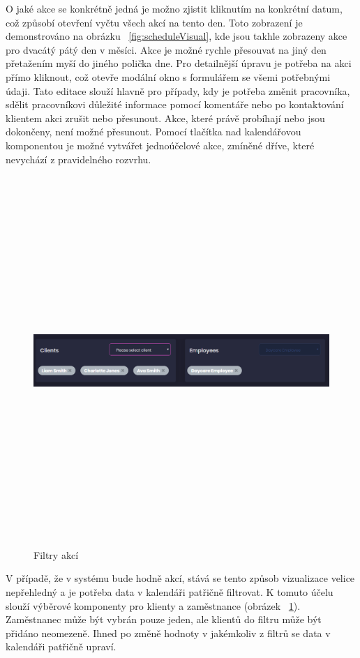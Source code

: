 \documentclass[
  biblatex,
  glossaries,
  index
]{kidiplom}
\begin{document}
O jaké akce se konkrétně jedná je možno zjistit kliknutím na konkrétní datum, což způsobí otevření vyčtu všech akcí na tento den. Toto zobrazení je demonstrováno na obrázku ~\ref{fig:scheduleVisual}, kde jsou takhle zobrazeny akce pro dvacátý pátý den v měsíci. Akce je možné rychle přesouvat na jiný den přetažením myší do jiného polička dne. Pro detailnější úpravu je potřeba na akci přímo kliknout, což otevře modální okno s formulářem se všemi potřebnými údaji. Tato editace slouží hlavně pro případy, kdy je potřeba změnit pracovníka, sdělit pracovníkovi důležité informace pomocí komentáře nebo po kontaktování klientem akci zrušit nebo přesunout. Akce, které právě probíhají nebo jsou dokončeny, není možné přesunout. Pomocí tlačítka nad kalendářovou komponentou je možné vytvářet jednoúčelové akce, zmíněné dříve, které nevychází z pravidelného rozvrhu.

\begin{figure}[H]
  	\centering
 	 \includegraphics[width=14cm,height=14cm,keepaspectratio]{schedule_filters}
 	 \caption{Filtry akcí}
 	 \label{fig:scheduleFilter}
\end{figure}

V případě, že v systému bude hodně akcí, stává se tento způsob vizualizace velice nepřehledný a je potřeba data v kalendáři patřičně filtrovat. K tomuto účelu slouží výběrové komponenty pro klienty a zaměstnance (obrázek ~\ref{fig:scheduleFilter}). Zaměstnanec může být vybrán pouze jeden, ale klientů do filtru může být přidáno neomezeně. Ihned po změně hodnoty v jakémkoliv z filtrů se data v kalendáři patřičně upraví.
\end{document}
